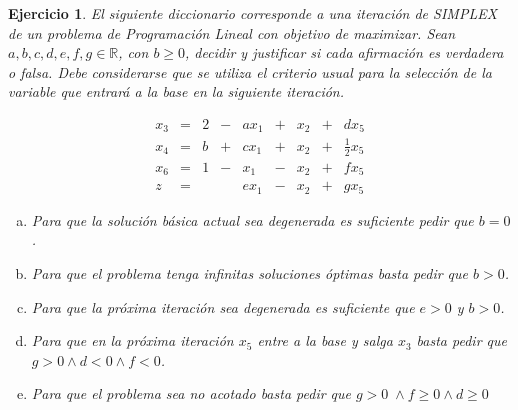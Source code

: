 \documentclass[a4paper,oneside,12pt]{amsart}
\newtheorem{quest}{Ejercicio}
\begin{document}


\begin{quest} 
El siguiente diccionario corresponde a una iteración de SIMPLEX de un problema de Programación Lineal con objetivo de maximizar. Sean $a,b,c,d,e,f,g\in \mathbb{R}$, con $b\geq 0$,
decidir y justificar si cada afirmación es verdadera o falsa. Debe considerarse que se utiliza el criterio usual para la selección de la variable que entrará a la base en la siguiente iteración.

\[
\begin{array}{rrrrrrrrr}
    x_3&=&2&-&ax_1&+&x_2&+&dx_5\\
    x_4&=&b&+&cx_1&+&x_2&+&\frac{1}{2}x_5\\
    x_6&=&1&-&x_1&-&x_2&+&fx_5\\ \hline
    z&=&&&ex_1&-&x_2 &+&gx_5
\end{array}
\]

\begin{enumerate}[a)]
    \item Para que la solución básica actual sea degenerada es suficiente pedir que $b=0$.
    \item Para que el problema tenga infinitas soluciones óptimas basta pedir que $b>0$.
    \item Para que la próxima iteración sea degenerada es suficiente que $e>0$ y $b>0$.
    \item Para que en la próxima iteración $x_5$ entre a la base y salga $x_3$ basta pedir que \mbox{$g>0\wedge d<0\wedge f<0$.}
    \item Para que el problema sea no acotado basta pedir que $g>0\;\wedge f\geq 0 \wedge d\geq 0$
\end{enumerate}

\end{quest}


\end{document}
